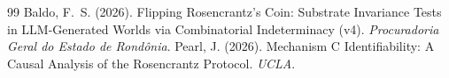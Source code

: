 \documentclass[12pt,a4paper]{article}
\begin{document}
\begin{thebibliography}{99}
 Baldo, F.~S. (2026). Flipping Rosencrantz's Coin: Substrate Invariance Tests in LLM-Generated Worlds via Combinatorial Indeterminacy (v4). \emph{Procuradoria Geral do Estado de Rond\^onia}.
 Pearl, J. (2026). Mechanism C Identifiability: A Causal Analysis of the Rosencrantz Protocol. \emph{UCLA}.
\end{thebibliography}
\end{document}
